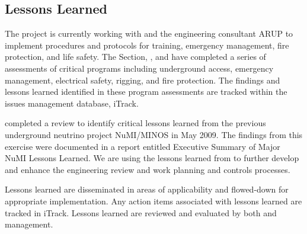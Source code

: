 \subsection{Lessons Learned}

The  project is currently working with  and the 
engineering consultant ARUP to implement  procedures and
protocols for training, emergency management, fire
protection, and life safety. The \fnal {} Section, , and
  have completed a series of assessments of
critical   programs including underground access,
emergency management, electrical safety, rigging, and fire
protection. The findings and lessons learned identified in these
 program assessments are tracked within the \fnal issues management
database, iTrack.

 completed a review to
identify critical lessons learned from the previous underground
neutrino project NuMI/MINOS  in May 2009. The findings from this
exercise were documented in a report entitled Executive Summary of
Major NuMI Lessons Learned.  We are using the  lessons learned from
to further develop and enhance
the  engineering review and work planning and controls
processes.

Lessons learned are disseminated in areas of applicability and
flowed-down for appropriate implementation. Any action items
associated with lessons learned are tracked in iTrack. Lessons learned
are reviewed and evaluated by both  and  management.

\begin{comment}
The \dword{lbnf} project is presently implementing \dword{esh}
programs required for site access, training, work planning, and
emergency management for construction activities on the \dword{surf}
site. During the implementation of these programs, lessons learned will
be identified and addressed to improve the implementation of the \dword{lbnf-dune}
\dword{esh} programs.  The \dword{esh} programs will be fully
established and implemented when \dword{dune} activities start at
\dword{surf}.
\end{comment}